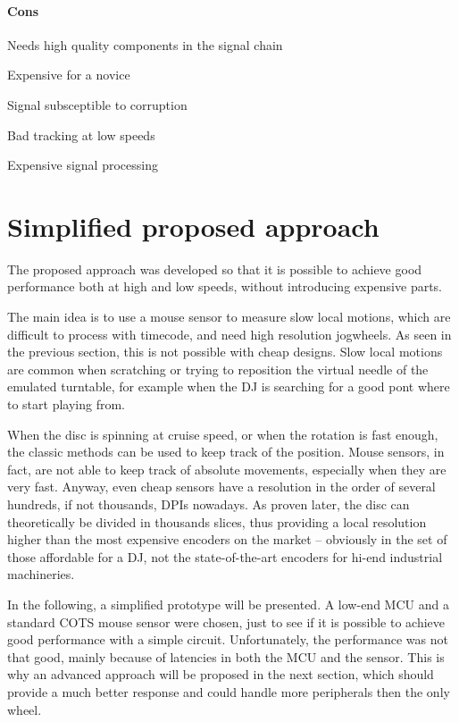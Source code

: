 \documentclass[a4paper,10pt]{article}
\begin{document}
\begin{multicols}{2}
\paragraph{Cons}
\begin{itemize*}
	\item Needs high quality components in the signal chain
	\item Expensive for a novice
	\item Signal subsceptible to corruption
	\item Bad tracking at low speeds
	\item Expensive signal processing
\end{itemize*}


\section{Simplified proposed approach}

The proposed approach was developed so that it is possible to achieve good
performance both at high and low speeds, without introducing expensive parts.

The main idea is to use a mouse sensor to measure slow local motions, which
are difficult to process with timecode, and need high resolution jogwheels.
As seen in the previous section, this is not possible with cheap designs.
Slow local motions are common when scratching or trying to reposition the
virtual needle of the emulated turntable, for example when the DJ is searching
for a good pont where to start playing from.

When the disc is spinning at cruise speed, or when the rotation is fast
enough, the classic methods can be used to keep track of the position.
Mouse sensors, in fact, are not able to keep track of absolute movements,
especially when they are very fast. Anyway, even cheap sensors have a
resolution in the order of several hundreds, if not thousands, DPIs nowadays.
As proven later, the disc can theoretically be divided in thousands slices,
thus providing a local resolution higher than the most expensive encoders on
the market -- obviously in the set of those affordable for a DJ, not the
state-of-the-art encoders for hi-end industrial machineries.

In the following, a simplified prototype will be presented. A low-end MCU and
a standard COTS mouse sensor were chosen, just to see if it is possible to
achieve good performance with a simple circuit. Unfortunately, the performance
was not that good, mainly because of latencies in both the MCU and the sensor.
This is why an advanced approach will be proposed in the next section, which
should provide a much better response and could handle more peripherals then
the only wheel.



\end{multicols}
\end{document}
